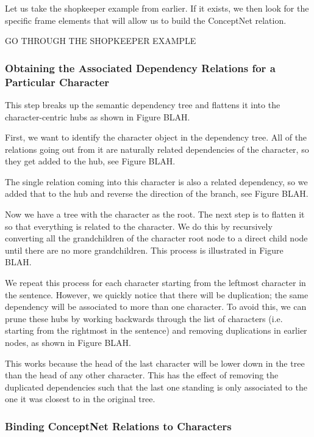 Let us take the shopkeeper example from earlier. If it exists, we then look for the specific frame elements that will allow us to build the ConceptNet relation.

GO THROUGH THE SHOPKEEPER EXAMPLE

\subsubsection{Obtaining the Associated Dependency Relations for a Particular Character}

This step breaks up the semantic dependency tree and flattens it into the character-centric hubs as shown in Figure BLAH.

First, we want to identify the character object in the dependency tree. All of the relations going out from it are naturally related dependencies of the character, so they get added to the hub, see Figure BLAH.

The single relation coming into this character is also a related dependency, so we added that to the hub and reverse the direction of the branch, see Figure BLAH.

Now we have a tree with the character as the root. The next step is to flatten it so that everything is related to the character. We do this by recursively converting all the grandchildren of the character root node to a direct child node until there are no more grandchildren. This process is illustrated in Figure BLAH.

We repeat this process for each character starting from the leftmost character in the sentence. However, we quickly notice that there will be duplication; the same dependency will be associated to more than one character. To avoid this, we can prune these hubs by working backwards through the list of characters (i.e. starting from the rightmost in the sentence) and removing duplications in earlier nodes, as shown in Figure BLAH. 

This works because the head of the last character will be lower down in the tree than the head of any other character. This has the effect of removing the duplicated dependencies such that the last one standing is only associated to the one it was closest to in the original tree.


\subsubsection{Binding ConceptNet Relations to Characters}
	
